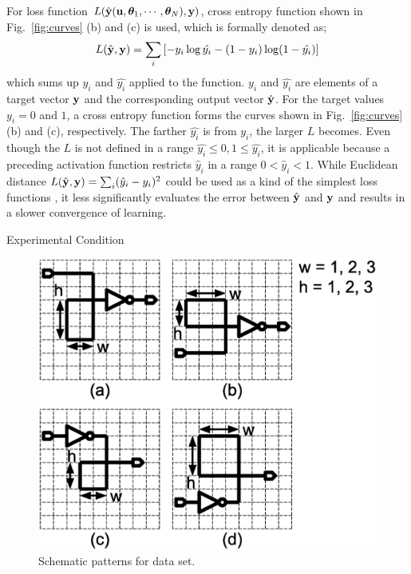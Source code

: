\documentclass[twocolumn]{article}
\makeatletter
\def\section{\@startsection {section}{1}{\z@}{20pt plus 2pt minus 2pt}
{8pt plus 2pt minus 2pt}{\centering\normalsize\sc
\edef\@svsec{\thesection.\ }}}
\def\thesection{\Roman{section}}
\makeatother
\begin{document}
For loss function
$L(\hat{\bf y}({\bf u},{\bm \theta}_1,\cdots,{\bm \theta}_N),{\bf y})$,
cross entropy function shown in Fig.\ \ref{fig:curves} (b) and (c)
is used, which is formally denoted as;
\begin{eqnarray}
L(\hat{\bf y},{\bf y})
= \sum_i \left[ - y_i \log \hat{y_i} - (1-y_i) \log (1-\hat{y_i}) \right]
\end{eqnarray}
which sums up $y_i$ and $\hat{y_i}$ applied to the function.
$y_i$ and $\hat{y_i}$ are elements of a target vector ${\bf y}$ and
the corresponding output vector $\hat{\bf y}$.
For the target values $y_i = 0$ and $1$,
a cross entropy function forms the curves
shown in Fig.\ \ref{fig:curves} (b) and (c), respectively.
The farther $\hat{y_i}$ is from $y_i$, the larger $L$ becomes.
Even though the $L$ is not defined in a range
$\hat{y_i} \le 0, 1 \le \hat{y_i}$,
it is applicable because a preceding activation function
restricts $\hat{y}_i$ in a range $0 < \hat{y}_i < 1$.
While Euclidean distance
$L(\hat{\bf y}, {\bf y}) = \sum_i (\hat{y}_i - y_i)^2$
could be used as a kind of the simplest loss functions \cite{mit},
it less significantly evaluates the error between $\hat{\bf y}$ and ${\bf y}$
and results in a slower convergence of learning.

\section{Experimental Condition}

\begin{figure}[!tp]
  \begin{minipage}{\hsize}
 \begin{center}
   \includegraphics[width=0.8\hsize]{fig/training_data_03.eps}
   \caption{Schematic patterns for data set.}
   \label{fig:training_data}
 \end{center}
  \end{minipage}
\end{figure}
\end{document}
